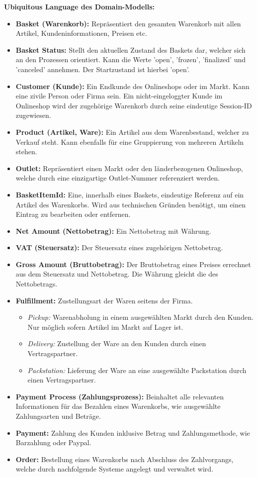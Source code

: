 {\large \textbf{Ubiquitous Language des Domain-Modells:}}
\begin{itemize}[topsep=-3px]
	\item \textbf{Basket (Warenkorb): } {Repräsentiert den gesamten Warenkorb mit allen Artikel, Kundeninformationen, Preisen etc.}
	\item \textbf{Basket Status: } {Stellt den aktuellen Zustand des Baskets dar, welcher sich an den Prozessen orientiert. Kann die Werte 'open', 'frozen', 'finalized' und 'canceled' annehmen. Der Startzustand ist hierbei 'open'.}
	\item \textbf{Customer (Kunde): } {Ein Endkunde des Onlineshops oder im Markt. Kann eine zivile Person oder Firma sein. Ein nicht-eingeloggter Kunde im Onlineshop wird der zugehörige Warenkorb durch seine eindeutige Session-ID zugewiesen.} 
	\item \textbf{Product (Artikel, Ware): } {Ein Artikel aus dem Warenbestand, welcher zu Verkauf steht. Kann ebenfalls für eine Gruppierung von mehreren Artikeln stehen.}
	\item \textbf{Outlet: } {Repräsentiert einen Markt oder den länderbezogenen Onlineshop, welche durch eine einzigartige Outlet-Nummer referenziert werden.}
	\item \textbf{BasketItemId: } {Eine, innerhalb eines Baskets, eindeutige Referenz auf ein Artikel des Warenkorbs. Wird aus technischen Gründen benötigt, um einen Eintrag zu bearbeiten oder entfernen.}
	\item \textbf{Net Amount (Nettobetrag): } {Ein Nettobetrag mit Währung.}
	\item \textbf{VAT (Steuersatz): } {Der Steuersatz eines zugehörigen Nettobetrag.}
	\item \textbf{Gross Amount (Bruttobetrag): } {Der Bruttobetrag eines Preises errechnet aus dem Steuersatz und Nettobetrag. Die Währung gleicht die des Nettobetrags.}
	\item \textbf{Fulfillment: } {Zustellungsart der Waren seitens der Firma.}
	\begin{itemize}[noitemsep,nolistsep, topsep=-5px]
		\item \textit{Pickup: } {Warenabholung in einem ausgewählten Markt durch den Kunden. Nur möglich sofern Artikel im Markt auf Lager ist.}
		\item \textit{Delivery: } {Zustellung der Ware an den Kunden durch einen Vertragspartner.}
		\item \textit{Packstation: } {Lieferung der Ware an eine ausgewählte Packstation durch einen Vertragspartner.}
	\end{itemize}
	\item \textbf{Payment Process (Zahlungsprozess): } {Beinhaltet alle relevanten Informationen für das Bezahlen eines Warenkorbs, wie ausgewählte Zahlungsarten und Beträge.}
	\item \textbf{Payment: } {Zahlung des Kunden inklusive Betrag und Zahlungsmethode, wie Barzahlung oder Paypal.}
	\item \textbf{Order: } {Bestellung eines Warenkorbs nach Abschluss des Zahlvorgangs, welche durch nachfolgende Systeme angelegt und verwaltet wird.}
\end{itemize}

